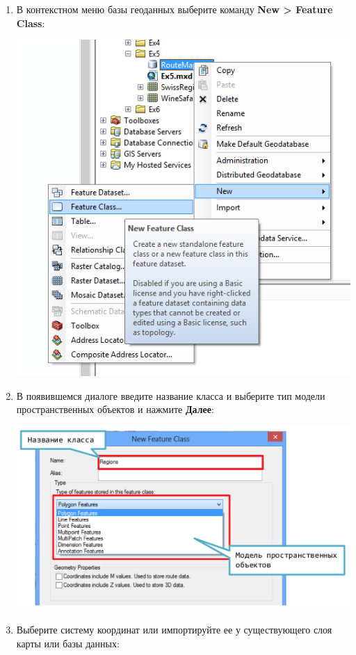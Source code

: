 \documentclass[12pt,]{book}
\begin{document}
\begin{enumerate}
\def\labelenumi{\arabic{enumi}.}
\item
  В контекстном меню базы геоданных выберите команду \textbf{New \textgreater{} Feature Class}:

  \includegraphics{images/Appendix/image76.png}
\item
  В появившемся диалоге введите название класса и выберите тип модели пространственных объектов и нажмите \textbf{Далее}:

  \includegraphics{images/Appendix/image77.png}
\item
  Выберите систему координат или импортируйте ее у существующего слоя карты или базы данных:


\end{enumerate}
\end{document}
